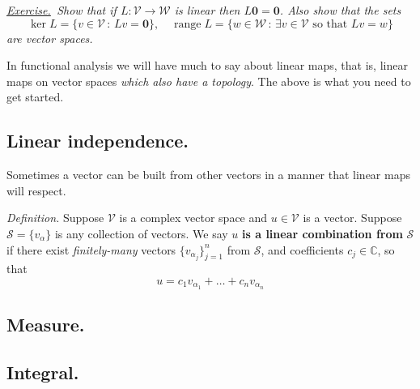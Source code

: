 \documentclass[12pt]{article}
\newcommand{\bzero}{\bm{0}}
\newcommand{\cS}{\mathcal{S}}
\newcommand{\cV}{\mathcal{V}}
\newcommand{\cW}{\mathcal{W}}
\newcommand{\CC}{\mathbb{C}}
\newcommand{\range}{\operatorname{range}}
\newcommand{\sect}[1]{\subsection*{#1.}}
\newcommand{\defin}{\emph{Definition.}\,\,}
\newcommand{\exer}[2]{\emph{\underline{Exercise.}\, #2} \vspace*{#1mm}}
\begin{document}
\clearpage\newpage
\exer{60}{Show that if $L:\cV \to \cW$ is linear then $L\bzero = \bzero$.  Also show that the sets
    $$\ker L = \{v\in\cV\,:\,Lv=\bzero\}, \quad \range L = \{w\in\cW\,:\,\exists v \in \cV \text{ so that } Lv=w\}$$
are vector spaces.}

In functional analysis we will have much to say about linear maps, that is, linear maps on vector spaces \emph{which also have a topology}.  The above is what you need to get started.


\sect{Linear independence}  Sometimes a vector can be built from other vectors in a manner that linear maps will respect.

\defin Suppose $\cV$ is a complex vector space and $u \in \cV$ is a vector.  Suppose $\cS = \{v_\alpha\}$ is any collection of vectors.  We say $u$ \textbf{is a linear combination from} $\cS$ if there exist \emph{finitely-many} vectors $\{v_{\alpha_j}\}_{j=1}^n$ from $\cS$, and coefficients $c_j\in\CC$, so that
	$$u = c_1 v_{\alpha_1} + \dots + c_n v_{\alpha_n}$$

\sect{Measure}

\sect{Integral}
\end{document}

